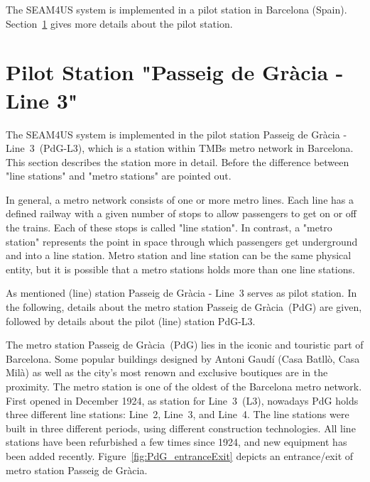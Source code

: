 The SEAM4US system is implemented in a pilot station in Barcelona (Spain). Section~\ref{sec:station} gives more details about the pilot station.


\section{Pilot Station "Passeig de Gr\`{a}cia - Line 3"}
\label{sec:station}


The SEAM4US system is implemented in the pilot station Passeig de Gr\`{a}cia - Line~3~(PdG-L3), which is a station within TMBs metro network in Barcelona. This section describes the station more in detail.
Before the difference between "line stations" and "metro stations" are pointed out.

In general, a metro network consists of one or more metro lines. Each line has a defined railway with a given number of stops to allow passengers to get on or off the trains. Each of these stops is called "line station". In contrast, a "metro station" represents the point in space through which passengers get underground and into a line station. Metro station and line station can be the same physical entity, but it is possible that a metro stations holds more than one line stations.

As mentioned (line) station Passeig de Gr\`{a}cia - Line~3 serves as pilot station. In the following, details about the metro station Passeig de Gr\`{a}cia~(PdG) are given, followed by details about the pilot (line) station PdG-L3.

The metro station Passeig de Gr\`{a}cia~(PdG) lies in the iconic and touristic part of Barcelona. Some popular buildings designed by Antoni Gaud\'{i} (Casa Batll\`{o}, Casa Mil\`{a}) as well as the city's most renown and exclusive boutiques are in the proximity.
The metro station is one of the oldest of the Barcelona metro network. First opened in December 1924, as station for Line~3~(L3), nowadays PdG holds three different line stations: Line~2, Line~3, and Line~4. The line stations were built in three different periods, using different construction technologies. All line stations have been refurbished a few times since 1924, and new equipment has been added recently. Figure~\ref{fig:PdG_entranceExit} depicts an entrance/exit of metro station Passeig de Gr\`{a}cia.

